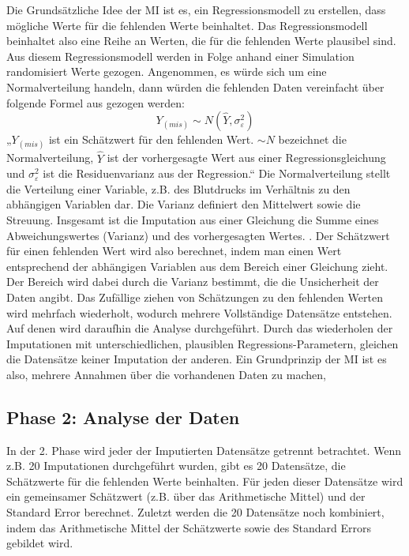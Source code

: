 Die Grundsätzliche Idee der MI ist es, ein Regressionsmodell zu erstellen, dass mögliche Werte für die fehlenden Werte 
beinhaltet. Das Regressionsmodell beinhaltet also eine Reihe an Werten, die für die fehlenden Werte plausibel sind.
Aus diesem Regressionsmodell werden in Folge anhand einer Simulation randomisiert Werte gezogen. Angenommen, es 
würde sich um eine Normalverteilung handeln, dann würden die fehlenden Daten vereinfacht über folgende Formel aus \textcite[8]{Enders2017} gezogen werden:
\begin{equation}
 Y_{(mis)}\sim N(\widehat{Y}, \sigma_\varepsilon^2)
\end{equation}
„$Y_{(mis)}$ ist ein Schätzwert für den fehlenden Wert. $\sim N$ bezeichnet die Normalverteilung, $\widehat{Y}$ ist der vorhergesagte Wert aus 
einer Regressionsgleichung und $\sigma_\varepsilon^2$ ist die Residuenvarianz aus der Regression.“ \autocite[8]{Enders2017}  Die Normalverteilung
stellt die Verteilung einer Variable, z.B. des Blutdrucks im Verhältnis zu den abhängigen Variablen dar. Die Varianz definiert den Mittelwert sowie die Streuung. 
Insgesamt ist die Imputation aus einer Gleichung die Summe eines Abweichungswertes 
(Varianz) und des vorhergesagten Wertes. \autocite[8]{Enders2017}. Der Schätzwert für einen fehlenden Wert wird also berechnet, indem man einen 
Wert entsprechend der abhängigen Variablen aus dem Bereich einer Gleichung zieht. Der Bereich wird dabei durch die Varianz bestimmt, die die Unsicherheit der Daten angibt.
Das Zufällige ziehen von Schätzungen zu den fehlenden Werten wird mehrfach wiederholt, wodurch mehrere Vollständige 
Datensätze entstehen. Auf denen wird daraufhin die Analyse durchgeführt. \autocite[163 ff.]{Lee2014} Durch das 
wiederholen der Imputationen mit unterschiedlichen, plausiblen Regressions-Parametern, gleichen die Datensätze keiner 
Imputation der anderen. \autocite[8]{Enders2017} Ein Grundprinzip der MI ist es also, mehrere Annahmen über die vorhandenen Daten zu machen, 

\subsection{Phase 2: Analyse der Daten}

In der 2. Phase wird jeder der Imputierten Datensätze getrennt betrachtet. Wenn z.B. 20 Imputationen durchgeführt wurden, 
gibt es 20 Datensätze, die Schätzwerte für die fehlenden Werte beinhalten. Für jeden dieser Datensätze wird ein gemeinsamer 
Schätzwert (z.B. über das Arithmetische Mittel) und der Standard Error berechnet. Zuletzt werden die 20 Datensätze noch 
kombiniert, indem das Arithmetische Mittel der Schätzwerte sowie des Standard Errors gebildet wird. \autocite[10]{Enders2017}

